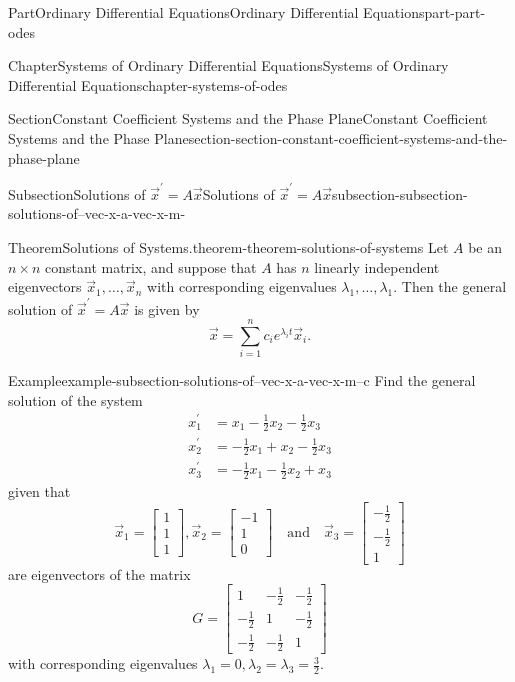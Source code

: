 \documentclass[twoside,10pt,]{book}
\numberwithin{equation}{part}
\begin{document}
\begin{partptx}{Part}{Ordinary Differential Equations}{}{Ordinary Differential Equations}{}{}{part-part-odes}
\begin{chapterptx}{Chapter}{Systems of Ordinary Differential Equations}{}{Systems of Ordinary Differential Equations}{}{}{chapter-systems-of-odes}
\begin{sectionptx}{Section}{Constant Coefficient Systems and the Phase Plane}{}{Constant Coefficient Systems and the Phase Plane}{}{}{section-section-constant-coefficient-systems-and-the-phase-plane}
\begin{subsectionptx}{Subsection}{Solutions of \(\vec{x}^\prime = A\vec{x}\)}{}{Solutions of \(\vec{x}^\prime = A\vec{x}\)}{}{}{subsection-subsection-solutions-of--vec-x-a-vec-x-m-}
\begin{theorem}{Theorem}{Solutions of Systems.}{}{theorem-theorem-solutions-of-systems}
Let \(A\) be an \(n\times n\) constant matrix, and suppose that \(A\) has \(n\) linearly independent eigenvectors \(\vec{x}_{1},\dots,\vec{x}_{n}\) with corresponding eigenvalues \(\lambda_{1},\dots,\lambda_{1}\). Then the general solution of \(\vec{x}^\prime=A\vec{x}\) is given by%
\begin{equation*}
\vec{x} = \sum_{i=1}^{n}c_{i}e^{\lambda_{i}t}\vec{x}_{i}.
\end{equation*}
%
\end{theorem}
\begin{example}{Example}{}{example-subsection-solutions-of--vec-x-a-vec-x-m--c}%
Find the general solution of the system%
\begin{align*}
x_{1}^\prime  & = x_{1}-\frac{1}{2}x_{2}-\frac{1}{2}x_{3}\\
x^\prime_{2}  & =  -\frac{1}{2}x_{1}+x_{2}-\frac{1}{2}x_{3}\\
x^\prime_{3}  & =  -\frac{1}{2}x_{1}-\frac{1}{2}x_{2}+x_{3}
\end{align*}
given that%
\begin{equation*}
\vec{x}_{1} = \begin{bmatrix}1\\1\\1\end{bmatrix},\vec{x}_{2} = \begin{bmatrix}-1\\1\\0\end{bmatrix}\quad\text{and}\quad\vec{x}_{3} = \begin{bmatrix}-\frac{1}{2}\\-\frac{1}{2}\\1\end{bmatrix}
\end{equation*}
are eigenvectors of the matrix%
\begin{equation*}
G = \begin{bmatrix}1 &  -\frac{1}{2}  &  -\frac{1}{2}\\-\frac{1}{2}  &  1 &  -\frac{1}{2} \\ -\frac{1}{2}  &  -\frac{1}{2}  &    1\end{bmatrix}
\end{equation*}
with corresponding eigenvalues \(\lambda_{1} = 0,\lambda_{2} = \lambda_{3} = \frac{3}{2}\).%
\par\smallskip%

\end{example}
\end{subsectionptx}
\end{sectionptx}
\end{chapterptx}
\end{partptx}
\end{document}
